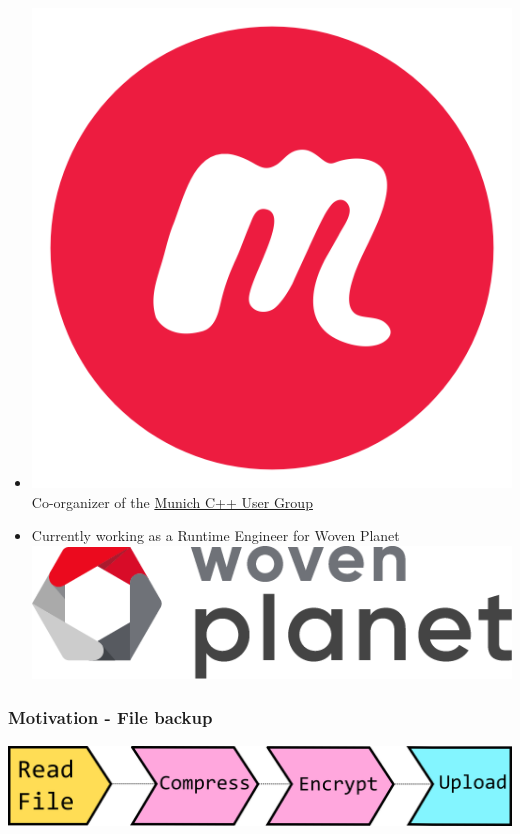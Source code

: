 \documentclass[aspectratio=169]{beamer}
\begin{document}
\begin{frame}[fragile]
\begin{itemize}
    \item \includegraphics[height=.05\textheight]{resources/meetup-icon.png} Co-organizer of the \href{https://www.meetup.com/MUCplusplus/}{Munich C++ User Group}

    \item Currently working as a Runtime Engineer for Woven Planet \includegraphics[height=.1\textheight]{resources/Woven_Planet_Holdings_Logo.png}

  \end{itemize}
\end{frame}

\begin{frame}[fragile]
  \frametitle{Motivation - File backup}
  \includegraphics[width=.9\textwidth]{pipelinesgfx/pipe_file_backup_full.png}
\end{frame}
\end{document}
